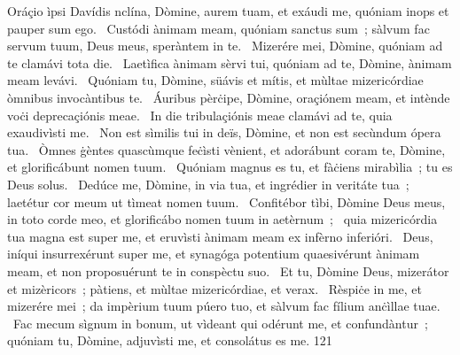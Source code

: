 { Oráçio ìpsi Davídis}
{%
nclína, Dòmine, aurem tuam, et exáudi me, quóniam inops et pauper sum ego. 
~Custódi ànimam meam, quóniam sanctus sum~; sàlvum fac servum tuum, Deus meus, speràntem in te. 
~Mizerére mei, Dòmine, quóniam ad te clamávi tota die. 
~Laetìfica ànimam sèrvi tui, quóniam ad te, Dòmine, ànimam meam levávi. 
~Quóniam tu, Dòmine, süávis et mítis, et mùltae mizericórdiae òmnibus invocàntibus te. 
~Áuribus pèrċipe, Dòmine, oraçiónem meam, et intènde voċi deprecaçiónis meae. 
~In die tribulaçiónis meae clamávi ad te, quia exaudivìsti me. 
~Non est sìmilis tui in deïs, Dòmine, et non est secùndum ópera tua. 
~Òmnes ġèntes quascùmque feċìsti vènient, et adorábunt coram te, Dòmine, et glorificábunt nomen tuum. 
~Quóniam magnus es tu, et fàċiens mirabìlia~; tu es Deus solus. 
~Dedúce me, Dòmine, in via tua, et ingrédier in veritáte tua~; laetétur cor meum ut tìmeat nomen tuum. 
~Confitébor tìbi, Dòmine Deus meus, in toto corde meo, et glorificábo nomen tuum in aetèrnum~; 
~quia mizericórdia tua magna est super me, et eruvìsti ànimam meam ex infèrno inferióri. 
~Deus, iníqui insurrexérunt super me, et synagóga potentium quaesivérunt ànimam meam, et non proposuérunt te in conspèctu suo. 
~Et tu, Dòmine Deus, mizerátor et mizèricors~; pàtiens, et mùltae mizericórdiae, et verax. 
~Rèspiċe in me, et mizerére mei~; da impèrium tuum púero tuo, et sàlvum fac fílium anċìllae tuae. 
~Fac mecum sìgnum in bonum, ut vìdeant qui odérunt me, et confundàntur~; quóniam tu, Dòmine, adjuvìsti me, et consolátus es me. 
}
{12}{1}
